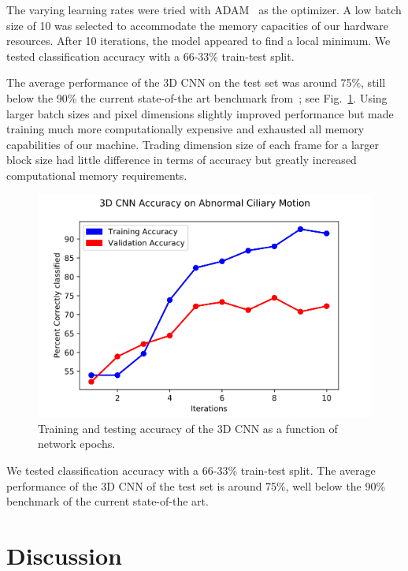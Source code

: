 The varying learning rates were tried with ADAM~\cite{kingma2014adam} as the optimizer. A low batch size of 10 was selected to accommodate the memory capacities of our hardware resources. After 10 iterations, the model appeared to find a local minimum. We tested classification accuracy with a 66-33\% train-test split. 

The average performance of the 3D CNN on the test set was around 75\%, still below the 90\% the current state-of-the art benchmark from~\cite{quinn2015automated}; see Fig.~\ref{fig:iterations}. Using larger batch sizes and pixel dimensions slightly improved performance but made training much more computationally expensive and exhausted all memory capabilities of our machine. Trading dimension size of each frame for a larger block size had little difference in terms of accuracy but greatly increased computational memory requirements.  

\begin{figure}
\includegraphics[scale=0.5]{CNN_graph}
\caption{Training and testing accuracy of the 3D CNN as a function of network epochs.}
\label{fig:iterations}

\end{figure}

We tested classification accuracy with a 66-33\% train-test split. The average performance of the 3D CNN of the test set is around 75\%, well below the 90\% benchmark of the current state-of-the art. 

\section{Discussion}


